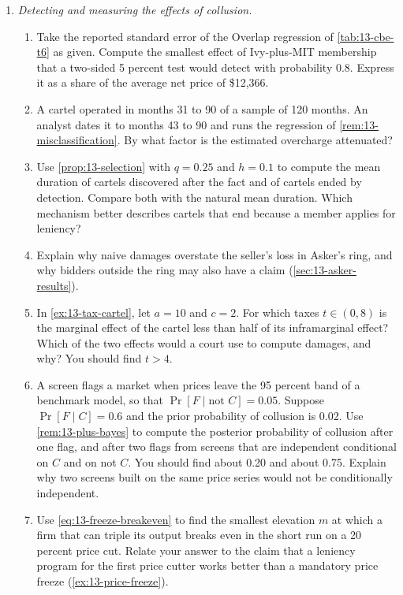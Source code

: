 \begin{enumerate}[label=\arabic*., leftmargin=*, itemsep=6pt]
\item \textit{Detecting and measuring the effects of collusion.}
\begin{enumerate}[label=(\alph*)]
  \item Take the reported standard error of the Overlap regression of \cref{tab:13-cbe-t6} as given. Compute the
  smallest effect of Ivy-plus-MIT membership that a two-sided 5 percent test would detect with probability 0.8.
  Express it as a share of the average net price of \$12{,}366.
  \item A cartel operated in months 31 to 90 of a sample of 120 months. An analyst dates it to months 43 to 90 and
  runs the regression of \cref{rem:13-misclassification}. By what factor is the estimated overcharge attenuated?
  \item Use \cref{prop:13-selection} with $q = 0.25$ and $h = 0.1$ to compute the mean duration of cartels
  discovered after the fact and of cartels ended by detection. Compare both with the natural mean duration. Which
  mechanism better describes cartels that end because a member applies for leniency?
  \item Explain why naive damages overstate the seller's loss in Asker's ring, and why bidders outside the ring may
  also have a claim (\cref{sec:13-asker-results}).
  \item In \cref{ex:13-tax-cartel}, let $a = 10$ and $c = 2$. For which taxes $t \in (0, 8)$ is the marginal effect
  of the cartel less than half of its inframarginal effect? Which of the two effects would a court use to compute
  damages, and why? You should find $t > 4$.
  \item A screen flags a market when prices leave the 95 percent band of a benchmark model, so that
  $\Pr[F \mid \text{not } C] = 0.05$. Suppose $\Pr[F \mid C] = 0.6$ and the prior probability of collusion is 0.02.
  Use \cref{rem:13-plus-bayes} to compute the posterior probability of collusion after one flag, and after two flags
  from screens that are independent conditional on $C$ and on not $C$. You should find about 0.20 and about 0.75.
  Explain why two screens built on the same price series would not be conditionally independent.
  \item Use \eqref{eq:13-freeze-breakeven} to find the smallest elevation $m$ at which a firm that can triple its
  output breaks even in the short run on a 20 percent price cut. Relate your answer to the claim that a leniency
  program for the first price cutter works better than a mandatory price freeze (\cref{ex:13-price-freeze}).
\end{enumerate}

\end{enumerate}
